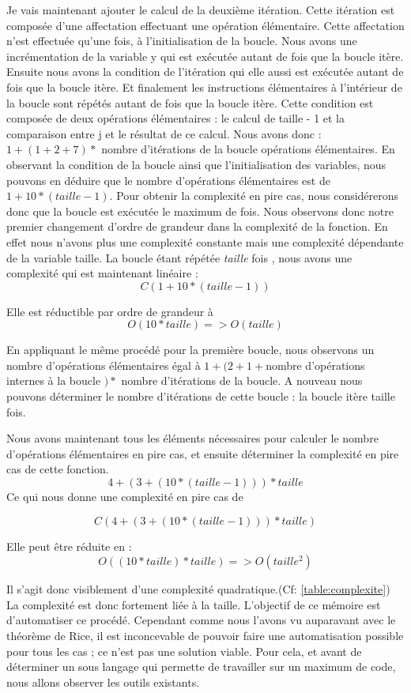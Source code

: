 \documentclass[12pt, twoside, openright]{report}
\begin{document}
Je vais maintenant ajouter le calcul de la deuxième itération. Cette itération est composée d'une affectation effectuant une opération élémentaire. Cette affectation n'est effectuée qu'une fois, à l'initialisation de la boucle. Nous avons une incrémentation de la variable y qui est exécutée autant de fois que la boucle itère. Ensuite nous avons la condition de l'itération qui elle aussi est exécutée autant de fois que la boucle itère. Et finalement les instructions élémentaires à l'intérieur de la boucle sont répétés autant de fois que la boucle itère. Cette condition est composée de deux opérations élémentaires : le calcul de taille - 1 et la comparaison entre j et le résultat de ce calcul. Nous avons donc  : $1 + (1 + 2 + 7) *$ nombre d'itérations de la boucle  opérations élémentaires. En observant la condition de la boucle ainsi que l'initialisation des variables, nous pouvons en déduire que le nombre d'opérations élémentaires est de $ 1 + 10 * (taille - 1)$. Pour obtenir la complexité en pire cas, nous considérerons donc que la boucle est exécutée le maximum de fois. Nous observons donc notre premier changement d'ordre de grandeur dans la complexité de la fonction. En effet nous n'avons plus une complexité constante mais une complexité dépendante de la variable taille. La boucle étant répétée \textit{taille} fois , nous avons une complexité qui est maintenant linéaire : \[C(1 + 10 * (taille-1))\] 

Elle est réductible par ordre de grandeur à \[O(10*taille) => O(taille)\]

En appliquant le même procédé pour la première boucle, nous observons un nombre d'opérations élémentaires égal à $1 + (2 + 1 + $nombre d'opérations internes à la boucle $) *$ nombre d'itérations de la boucle. A nouveau nous pouvons déterminer le nombre d'itérations de cette boucle : la boucle itère taille fois. 

Nous avons maintenant tous les éléments nécessaires pour calculer le nombre d'opérations élémentaires en pire cas, et ensuite déterminer la complexité en pire cas de cette fonction. 
$$ 4 + ( 3 + (10 * (taille - 1))) * taille$$
Ce qui nous donne une complexité en pire cas de 

\[C(4 + (3 + (10 * (taille - 1))) * taille)\] 

Elle peut être réduite en : \[O((10*taille) * taille) => O(taille^{2})\] 

 Il s'agit donc visiblement d'une complexité quadratique.(Cf: \ref{table:complexite}) La complexité est donc fortement liée à la taille. L'objectif de ce mémoire est d'automatiser ce procédé. Cependant comme nous l'avons vu auparavant avec le théorème de Rice, il est inconcevable de pouvoir faire une automatisation possible pour tous les cas ; ce n'est pas une solution viable. Pour cela, et avant de déterminer un sous langage qui permette de travailler sur un maximum de code, nous allons observer les outils existants. 
\end{document}
